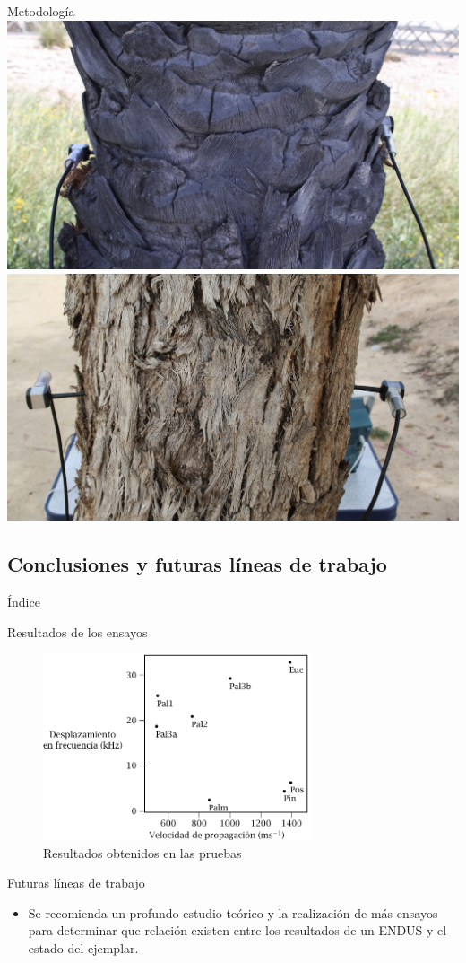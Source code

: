 \documentclass[utf8, compress]			{beamer}
\begin{document}
\begin{frame}{Metodología}
    \includegraphics{mpalmera.jpg}
    \includegraphics{meucalipto.jpg}
\end{frame}


\subsection{Conclusiones y futuras líneas de trabajo}

\begin{frame}{Índice}
    \tableofcontents[currentsubsection]
\end{frame}

\begin{frame}{Resultados de los ensayos}
    \begin{figure}
	\includegraphics[height=55mm, keepaspectratio]{resultados.pdf}
	\caption{Resultados obtenidos en las pruebas}
	\label{fig:results}
    \end{figure}
\end{frame}

\begin{frame}{Futuras líneas de trabajo}
    \begin{itemize}
	\item Se recomienda un profundo estudio teórico y la
	    realización de más ensayos para determinar que relación
	    existen entre los resultados de un ENDUS y el estado
	    del ejemplar.
    \end{itemize}
\end{frame}
\end{document}
